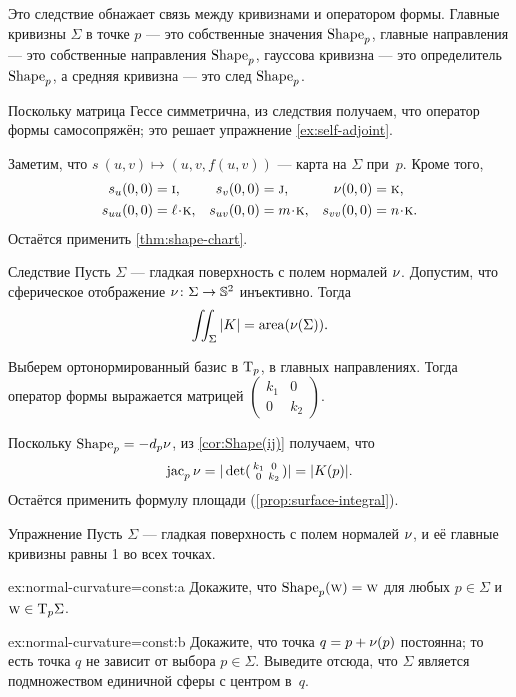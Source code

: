 Это следствие обнажает связь между кривизнами и оператором формы.
Главные кривизны $\Sigma$ в точке $p$ --- это собственные значения $\mathop{\rm Shape}\nolimits_p$, главные направления --- это собственные направления $\mathop{\rm Shape}\nolimits_p$, гауссова кривизна --- это определитель $\mathop{\rm Shape}\nolimits_p$, а средняя кривизна --- это след $\mathop{\rm Shape}\nolimits_p$.

Поскольку матрица Гессе симметрична, из следствия получаем, что оператор формы самосопряжён;
это решает упражнение \ref{ex:self-adjoint}.

Заметим, что $s\:(u,v)\mapsto (u,v,f(u,v))$ --- карта на $\Sigma$ при~$p$.
Кроме того, 
\begin{align*}
s_u(0,0)&=\vec i,
&
s_v(0,0)&=\vec j,
&
\Norm(0,0)&=\vec k,
\\
s_{uu}(0,0)&=\ell\cdot \vec k,
&
s_{uv}(0,0)&=m\cdot \vec k,
&
s_{vv}(0,0)&=n\cdot \vec k.
\end{align*}
Остаётся применить \ref{thm:shape-chart}.
\qeds


\begin{thm}{Следствие}\label{cor:intK}
Пусть $\Sigma$ --- гладкая поверхность с полем нормалей $\nu$.
Допустим, что сферическое отображение $\nu\colon\Sigma\to\mathbb{S}^2$ инъективно.
Тогда 
\[\iint_\Sigma|K|=\mathop{\rm area}\nolimits(\nu(\Sigma)).\]
\end{thm}

{\sloppy

Выберем ортонормированный базис в $\mathrm{T}_p$, в главных направлениях.
Тогда оператор формы выражается матрицей 
$(\begin{smallmatrix}
 k_1
 &0
 \\
 0
 &k_2
\end{smallmatrix})$.

}

Поскольку $\mathop{\rm Shape}\nolimits_p=-d_p\nu$, из \ref{cor:Shape(ij)} получаем, что
\[\mathop{\rm jac}\nolimits_p\nu=|\det(\begin{smallmatrix}
 k_1
 &0
 \\
 0
 &k_2
 \end{smallmatrix})|=|K(p)|.\]
Остаётся применить формулу площади (\ref{prop:surface-integral}).
\qeds



\begin{thm}{Упражнение}\label{ex:normal-curvature=const}
Пусть $\Sigma$ --- гладкая поверхность с полем нормалей $\nu$, и её главные кривизны  равны 1 во всех точках.

\begin{subthm}{ex:normal-curvature=const:a}
Докажите, что $\mathop{\rm Shape}\nolimits_p(\text{\sc{w}})=\text{\sc{w}}$ для любых $p\in\Sigma$ и $\text{\sc{w}}\in \mathrm{T}_p\Sigma$.
\end{subthm}

\begin{subthm}{ex:normal-curvature=const:b}
Докажите, что точка $q\z= p+\Norm(p)$ постоянна; то есть точка $q$ не зависит от выбора $p\in\Sigma$.
Выведите отсюда, что $\Sigma$ является подмножеством единичной сферы с центром в~$q$.
\end{subthm}

\end{thm}

